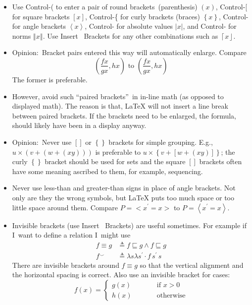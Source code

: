 \begin{itemize}
\item Use Control-( to enter a pair of round brackets\ (parenthesis) $\left(
x\right) $, Control-[ for square brackets $\left[ x\right] $, Control-\{ for
curly brackets (braces) $\left\{ x\right\} $, Control-\TEXTsymbol{<} for
angle brackets $\left\langle x\right\rangle $, Control-\TEXTsymbol{\backslash%
} for absolute values $\left\vert x\right\vert $, and Control-\TEXTsymbol{%
\vert} for norms $\left\Vert x\right\Vert $. Use Insert \TEXTsymbol{>}%
\TEXTsymbol{>}\ Brackets for any other combinations such as $\left\lceil
x\right\rfloor $.

\item Opinion:\ Bracket pairs entered this way will automatically enlarge.
Compare 
\begin{equation*}
\left( \frac{fx}{gx},hx\right) \text{ to }(\frac{fx}{gx},hx)
\end{equation*}%
The former is preferable.

\item However, avoid such \textquotedblleft paired
brackets\textquotedblright\ in in-line math (as opposed to displayed math).
The reason is that, LaTeX will not insert a line break between paired
brackets. If the brackets need to be enlarged, the formula, should likely
have been in a display anyway.

\item Opinion:\ Never use $\left[ {}\right] $ or $\left\{ {}\right\} $
brackets for simple grouping. E.g., $u\times \left( v+\left( w+\left(
xy\right) \right) \right) $ is preferable to $u\times \left\{ v+\left[
w+\left( xy\right) \right] \right\} $; the curly $\left\{ {}\right\} $
bracket should be used for sets and the square $\left[ {}\right] $ brackets
often have some meaning ascribed to them, for example, sequencing.

\item Never use less-than and greater-than signs in place of angle brackets.
Not only are they the wrong symbols, but LaTeX puts too much space or too
little space around them. Compare $P=<x^{\prime }=x>$ to $P=\left\langle
x^{\prime }=x\right\rangle $.

\item Invisible brackets (use Insert \TEXTsymbol{>}\TEXTsymbol{>}\ Brackets)
are useful sometimes. For example if I\ want to define a relation I\ might
use%
\begin{align*}
\left. f\equiv g\right. & \triangleq f\sqsubseteq g\wedge f\sqsubseteq g \\
f^{\smallsmile }& \triangleq \lambda s\lambda s^{\prime }\cdot f\,s^{\prime
}\,s
\end{align*}%
There are invisible brackets around $f\equiv g$ so that the vertical
alignment and the horizontal spacing is correct. Also use an invisible
bracket for cases:%
\begin{equation*}
f(x)=\left\{ 
\begin{array}{lll}
g(x) & \qquad & \text{if }x>0 \\ 
h(x) &  & \text{otherwise}%
\end{array}%
\right.
\end{equation*}


\end{itemize}
